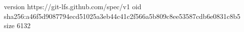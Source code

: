 version https://git-lfs.github.com/spec/v1
oid sha256:a46f5d9087794ecd51025a3eb44c41c2f566a5b809c8ee53587cdb6e0831c8b5
size 6132
